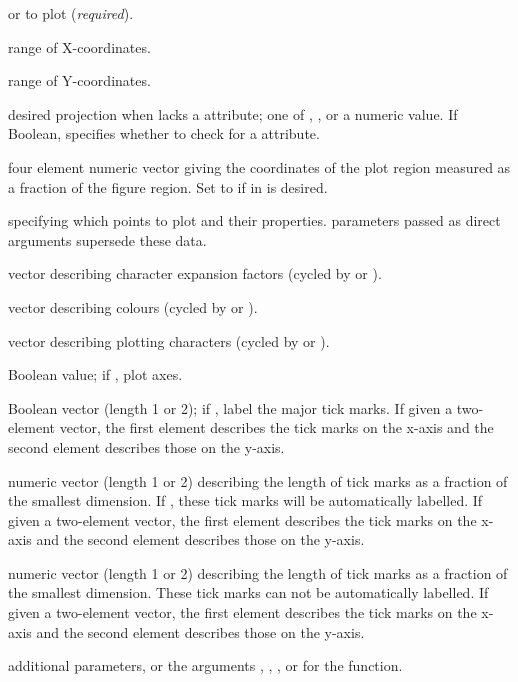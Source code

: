 \documentclass[letterpaper]{book}
\begin{document}
\begin{Arguments}
\begin{ldescription}
\item[\code{data}]  or  to plot (\emph{required}).
\item[\code{xlim}] range of X-coordinates.
\item[\code{ylim}] range of Y-coordinates.
\item[\code{projection}] desired projection when  lacks a
 attribute; one of , ,
or a numeric value.  If Boolean, specifies whether to check
 for a  attribute.
\item[\code{plt}] four element numeric vector  giving
the coordinates of the plot region measured as a fraction of the
figure region. Set to  if  in  is
desired.
\item[\code{polyProps}]  specifying which points to plot and their
properties.   parameters passed as direct arguments
supersede these data.
\item[\code{cex}] vector describing character expansion factors (cycled by
 or ).
\item[\code{col}] vector describing colours (cycled by  or
).
\item[\code{pch}] vector describing plotting characters (cycled by 
or ).
\item[\code{axes}] Boolean value; if , plot axes.
\item[\code{tckLab}] Boolean vector (length 1 or 2); if ,
label the major tick marks.  If given a two-element
vector, the first element describes the tick marks on the
x-axis and the second element describes those on the y-axis.
\item[\code{tck}] numeric vector (length 1 or 2) describing the length
of tick marks as a fraction of the smallest dimension. If
, these tick marks will be automatically
labelled.  If given a two-element vector, the first element
describes the tick marks on the x-axis and the second element
describes those on the y-axis.
\item[\code{tckMinor}] numeric vector (length 1 or 2) describing the length
of tick marks as a fraction of the smallest dimension.  These tick
marks can not be automatically labelled.  If given a two-element vector,
the first element describes the tick marks on the x-axis and
the second element describes those on the y-axis.
\item[\code{...}] additional  parameters, or the arguments
, , , or  for the
 function.
\end{ldescription}
\end{Arguments}
\end{document}
